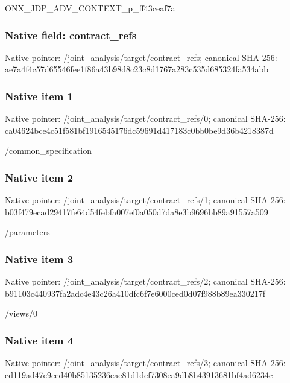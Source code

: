 \documentclass[10pt,a4paper]{article}
\begin{document}
\begingroup\raggedright\sloppy ONX\_\allowbreak{}JDP\_\allowbreak{}ADV\_\allowbreak{}CONTEXT\_\allowbreak{}p\_\allowbreak{}ff43ceaf7a\par\endgroup

\subsubsection{Native field: contract\_\allowbreak{}refs}
Native pointer: /joint\_\allowbreak{}analysis/target/contract\_\allowbreak{}refs; canonical SHA-256: ae7a4f4c57d65546fee1f86a43b98d8c23c8d1767a283c535d685324fa534abb

\subsubsection{Native item 1}
Native pointer: /joint\_\allowbreak{}analysis/target/contract\_\allowbreak{}refs/0; canonical SHA-256: ca04624bce4c51f581bf1916545176dc59691d417183c0bb0be9d36b4218387d

\begingroup\raggedright\sloppy /\allowbreak{}common\_\allowbreak{}specification\par\endgroup

\subsubsection{Native item 2}
Native pointer: /joint\_\allowbreak{}analysis/target/contract\_\allowbreak{}refs/1; canonical SHA-256: b03f479ecad29417fe64d54febfa007ef0a050d7da8e3b9696bb89a91557a509

\begingroup\raggedright\sloppy /\allowbreak{}parameters\par\endgroup

\subsubsection{Native item 3}
Native pointer: /joint\_\allowbreak{}analysis/target/contract\_\allowbreak{}refs/2; canonical SHA-256: b91103c440937fa2adc4e43c26a410dfc6f7e6000ced0d07f988b89ea330217f

\begingroup\raggedright\sloppy /\allowbreak{}views/\allowbreak{}0\par\endgroup

\subsubsection{Native item 4}
Native pointer: /joint\_\allowbreak{}analysis/target/contract\_\allowbreak{}refs/3; canonical SHA-256: cd119ad47e9ced40b85135236eae81d1dcf7308ea9db8b43913681bf4ad6234c
\end{document}
